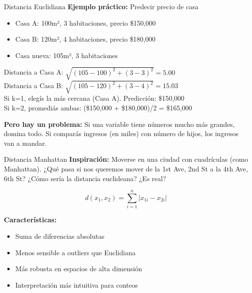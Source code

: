 \documentclass{beamer}
\begin{document}
\begin{frame}{Distancia Euclidiana}
    \textbf{Ejemplo práctico:} Predecir precio de casa
    \begin{itemize}
        \item Casa A: 100m², 3 habitaciones, precio \$150,000
        \item Casa B: 120m², 4 habitaciones, precio \$180,000  
        \item Casa nueva: 105m², 3 habitaciones
    \end{itemize}
    
    Distancia a Casa A: $\sqrt{(105-100)^2 + (3-3)^2} = 5.00$ \\
    Distancia a Casa B: $\sqrt{(105-120)^2 + (3-4)^2} = 15.03$ \\
    
    Si k=1, elegís la más cercana (Casa A). Predicción: \$150,000 \\
    Si k=2, promediás ambas: (\$150,000 + \$180,000)/2 = \$165,000

    \vspace{0.3em}
    \textbf{Pero hay un problema:} Si una variable tiene números mucho más grandes, domina todo. Si comparás ingresos (en miles) con número de hijos, los ingresos van a mandar.
\end{frame}

\begin{frame}{Distancia Manhattan}
    \textbf{Inspiración:} Moverse en una ciudad con cuadrículas (como Manhattan). ¿Qué pasa si nos queremos mover de la 1st Ave, 2nd St a la 4th Ave, 6th St? ¿Cómo sería la distancia euclideana? ¿Es real?
    
    \[d(x_1, x_2) = \sum_{i=1}^{n} |x_{1i} - x_{2i}|\]
    
    \vspace{0.3cm}
    
    \textbf{Características:}
    \begin{itemize}
        \item Suma de diferencias absolutas
        \item Menos sensible a outliers que Euclidiana
        \item Más robusta en espacios de alta dimensión
        \item Interpretación más intuitiva para conteos
    \end{itemize}
\end{frame}
\end{document}
